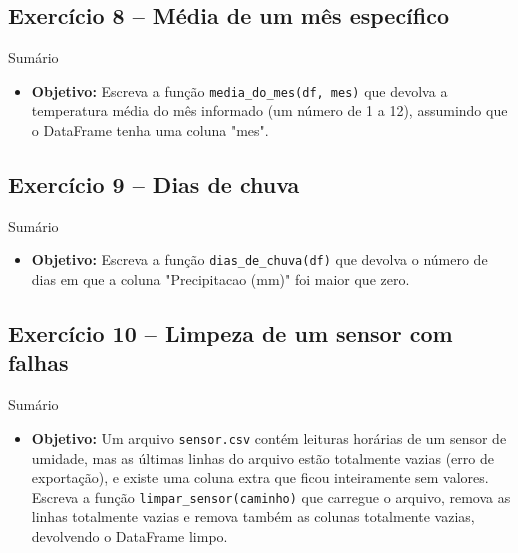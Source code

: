 \documentclass[11pt,a4paper]{article}
\begin{document}
\subsection*{Exercício 8 -- Média de um mês específico}
\begin{exercicio}{Sumário}
\begin{itemize}
    \item \textbf{Objetivo:} Escreva a função \texttt{media\_do\_mes(df, mes)} que devolva a temperatura média do mês informado (um número de 1 a 12), assumindo que o DataFrame tenha uma coluna "mes".
\end{itemize}
\end{exercicio}

\subsection*{Exercício 9 -- Dias de chuva}
\begin{exercicio}{Sumário}
\begin{itemize}
    \item \textbf{Objetivo:} Escreva a função \texttt{dias\_de\_chuva(df)} que devolva o número de dias em que a coluna "Precipitacao (mm)" foi maior que zero.
\end{itemize}
\end{exercicio}

\subsection*{Exercício 10 -- Limpeza de um sensor com falhas}
\begin{exercicio}{Sumário}
\begin{itemize}
    \item \textbf{Objetivo:} Um arquivo \texttt{sensor.csv} contém leituras horárias de um sensor de umidade, mas as últimas linhas do arquivo estão totalmente vazias (erro de exportação), e existe uma coluna extra que ficou inteiramente sem valores. Escreva a função \texttt{limpar\_sensor(caminho)} que carregue o arquivo, remova as linhas totalmente vazias e remova também as colunas totalmente vazias, devolvendo o DataFrame limpo.
\end{itemize}
\end{exercicio}
\end{document}
